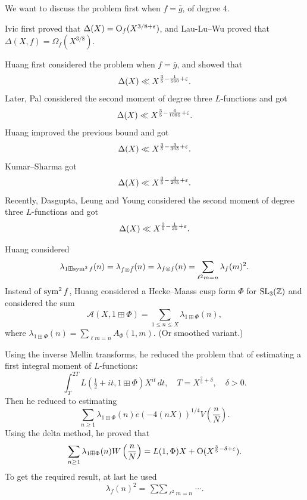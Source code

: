 \documentclass[reqno]{amsart} 
\begin{document}
We want to discuss the problem first when $f = \bar{g}$, of degree $4$.

Ivic first proved that $\Delta(X) = \operatorname{O}_f(X^{3/8 + \varepsilon})$, and Lau-Lu--Wu proved that $\Delta(X, f) = \Omega_f(X^{3/8})$.

Huang first considered the problem when $f = \bar{g}$, and showed that
\begin{equation*}
  \Delta(X) \ll X^{\frac{3}{5} - \frac{1}{560} + \varepsilon}.
\end{equation*}
Later, Pal considered the second moment of degree three $L$-functions and got
\begin{equation*}
  \Delta(X) \ll X^{\frac{3}{5} - \frac{6}{1085} + \varepsilon}.
\end{equation*}
Huang improved the previous bound and got
\begin{equation*}
  \Delta(X) \ll X^{\frac{3}{5} - \frac{3}{305} + \varepsilon}.
\end{equation*}
Kumar--Sharma got
\begin{equation*}
  \Delta(X) \ll X^{\frac{3}{5} - \frac{3}{205} + \varepsilon}.
\end{equation*}
Recently, Dasgupta, Leung and Young considered the second moment of degree three $L$-functions and got
\begin{equation*}
  \Delta(X) \ll X^{\frac{3}{5} - \frac{1}{35} + \varepsilon}.
\end{equation*}

Huang considered
\begin{equation*}
  \lambda_{1 \boxplus \operatorname{sym}^2 f}(n) = \lambda_{f \otimes \bar{f}}(n)
  = \lambda_{f \otimes f}(n)
  = \sum_{\ell^2 m = n} \lambda_f(m)^2.
\end{equation*}
Instead of $\operatorname{sym}^2 f$, Huang considered a Hecke--Maass cusp form $\Phi$ for $\operatorname{SL}_3(\mathbb{Z})$ and considered the sum
\begin{equation*}
  \mathcal{A}(X, 1 \boxplus \Phi) = \sum_{1 \leq n \leq X} \lambda_{1 \boxplus \Phi}(n),
\end{equation*}
where $\lambda_{1 \boxplus \Phi}(n) = \sum_{\ell m = n} A_{\Phi}(1, m)$.  (Or smoothed variant.)

Using the inverse Mellin transforms, he reduced the problem that of estimating a first integral moment of $L$-functions:
\begin{equation*}
  \int_{T}^{2 T}L(\tfrac{1}{2} + i t, 1 \boxplus \Phi) X^{i t} \, d t, \quad T = X^{\frac{2}{5} + \delta}, \quad \delta > 0.
\end{equation*}
Then he reduced to estimating
\begin{equation*}
  \sum_{n \geq 1} \lambda_{1 \boxplus \Phi}(n) e(- 4(n X))^{1/4} V \left( \frac{n}{N} \right).
\end{equation*}
Using the delta method, he proved that
\begin{equation*}
  \sum_{n \geq 1} \lambda_{1 \boxplus \Phi}(n) W \left( \frac{n}{N} \right) = L(1, \Phi) X
  + \operatorname{O}(X^{\frac{3}{5} - \delta + \varepsilon}).
\end{equation*}
To get the required result, at last he used
\begin{equation*}
  \lambda_f(n)^2 = \mathop{\sum \sum }_{\ell^2 m = n} \dotsb.
\end{equation*}
\end{document}
